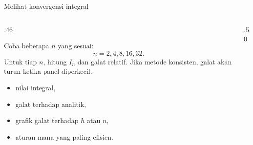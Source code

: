 \documentclass[aspectratio=169,10pt]{beamer}
\begin{document}
\begin{frame}{Melihat konvergensi integral}
\scriptsize
\begin{columns}[T,totalwidth=\textwidth]
\begin{column}{.46\textwidth}
\begin{bluebox}
Coba beberapa $n$ yang sesuai:
\[
n=2,4,8,16,32.
\]
Untuk tiap $n$, hitung $I_n$ dan galat relatif. Jika metode konsisten, galat akan turun ketika panel diperkecil.
\end{bluebox}
\begin{orangebox}
\begin{itemize}\setlength\itemsep{1pt}
\item nilai integral,
\item galat terhadap analitik,
\item grafik galat terhadap $h$ atau $n$,
\item aturan mana yang paling efisien.
\end{itemize}
\end{orangebox}
\end{column}
\begin{column}{.50\textwidth}
\end{column}
\end{columns}
\end{frame}
\end{document}
